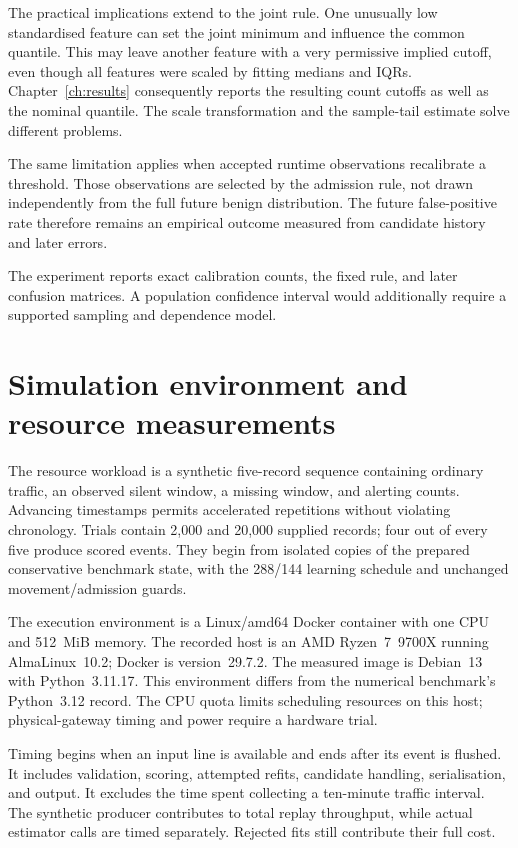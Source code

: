 The practical implications extend to the joint rule. One unusually
low standardised feature can set the joint minimum and influence
the common quantile. This may leave another feature with a very
permissive implied cutoff, even though all features were scaled
by fitting medians and IQRs. Chapter~\ref{ch:results} consequently
reports the resulting count cutoffs as well as the nominal quantile.
The scale transformation and the sample-tail estimate solve
different problems.

The same limitation applies when accepted runtime observations
recalibrate a threshold. Those observations are selected by the
admission rule, not drawn independently from the full future benign
distribution. The future false-positive rate therefore remains an empirical
outcome measured from candidate history and later errors.

The experiment reports exact calibration counts, the fixed rule, and later
confusion matrices. A population confidence interval would additionally
require a supported sampling and dependence model.

\section{Simulation environment and resource measurements}
\label{sec:experimental-resources}

The resource workload is a synthetic five-record sequence containing
ordinary traffic, an observed silent window, a missing window, and
alerting counts. Advancing timestamps permits accelerated repetitions
without violating chronology. Trials contain 2,000 and 20,000 supplied
records; four out of every five produce scored events. They begin from
isolated copies of the prepared conservative benchmark state, with the
288/144 learning schedule and unchanged movement/admission guards.

The execution environment is a Linux/amd64 Docker container with one CPU
and 512~MiB memory. The recorded host is an AMD Ryzen~7~9700X running
AlmaLinux~10.2; Docker is version~29.7.2. The measured image is Debian~13
with Python~3.11.17. This environment differs from the numerical
benchmark's Python~3.12 record. The CPU quota limits scheduling resources
on this host; physical-gateway timing and power require a hardware trial.

Timing begins when an input line is available and ends after its event
is flushed. It includes validation, scoring, attempted refits, candidate
handling, serialisation, and output. It excludes the time spent collecting
a ten-minute traffic interval. The synthetic producer contributes to total
replay throughput, while actual estimator calls are timed separately.
Rejected fits still contribute their full cost.

